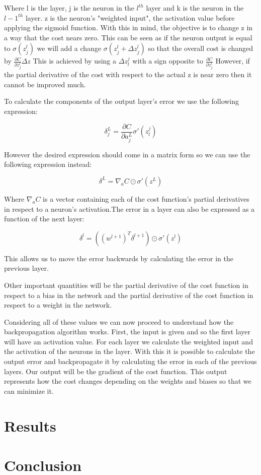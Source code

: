 \documentclass[a4paper, 12pt]{amsart}
\begin{document}
Where l is the layer, j is the neuron in the $l^{th}$ layer and k is the neuron
in the $l-1^{th}$ layer. z is the neuron's "weighted input", the activation value before applying the sigmoid function. With this in mind, the objective is to change z in a way that the cost nears zero. This can be seen as if the neuron output is equal to $\sigma(z_j^l)$  we will add a change $\sigma(z_j^l + \Delta z_j^l)$ so that the overall cost is changed by $\frac{\partial C}{\partial z_j^l}\Delta z$ This is achieved by using a $\Delta z_l^j$ with a sign opposite to $\frac{\partial C}{\partial z_j^l}$ However, if the partial derivative of the cost with respect to the actual z is near zero then it cannot be improved much. 

To calculate the components of the output layer's error we use the following expression:

\[\delta^L_j = \frac{\partial C}{\partial a^L_j}\sigma '(z^j_l)\]

However the desired expression should come in a matrix form so we can use the following expression instead:

\[\delta^L = \nabla_a C \odot \sigma '(z^L)\]

Where $\nabla_a C$ is a vector containing each of the cost function's partial derivatives in respect to a neuron's activation.The error in a layer can also be expressed as a function of the next layer:

\[\delta^l = ((w^{l+1})^T\delta^{l+1})\odot\sigma '(z^l)\]

This allows us to move the error backwards by calculating the error in the previous layer.

Other important quantities will be the partial derivative of the cost function in respect to a bias in the network and the partial derivative of the cost function in respect to a weight in the network. 

Considering all of these values we can now proceed to understand how the backpropagation algorithm works. First, the input is given and so the first layer will have an activation value. For each layer we calculate the weighted input and the activation of the neurons in the layer. With this it is possible to calculate the output error and backpropagate it by calculating the error in each of the previous layers. Our output will be the gradient of the cost function. This output represents how the cost changes depending on the weights and biases so that we can minimize it. 

\section{Results}
\section{Conclusion}
\end{document}

